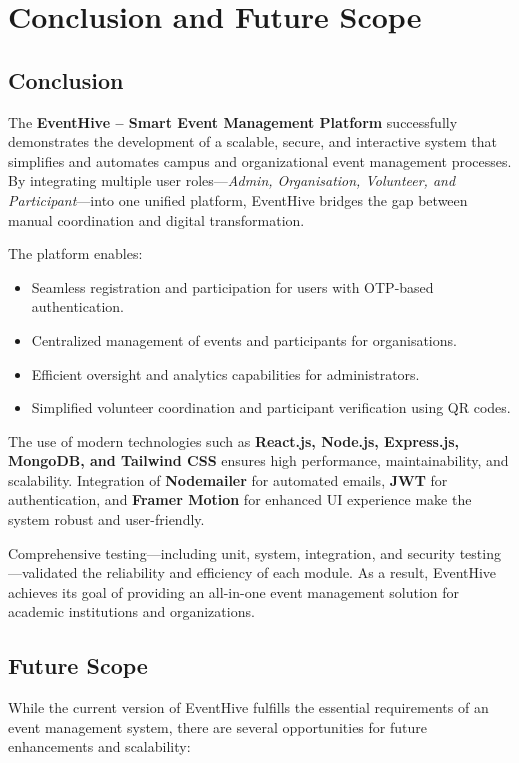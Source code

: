 \documentclass[12pt,a4paper]{report}
\begin{document}
\chapter{Conclusion and Future Scope}

\section{Conclusion}

The \textbf{EventHive – Smart Event Management Platform} successfully demonstrates the development of a scalable, secure, and interactive system that simplifies and automates campus and organizational event management processes. By integrating multiple user roles—\textit{Admin, Organisation, Volunteer, and Participant}—into one unified platform, EventHive bridges the gap between manual coordination and digital transformation.

The platform enables:
\begin{itemize}
    \item Seamless registration and participation for users with OTP-based authentication.
    \item Centralized management of events and participants for organisations.
    \item Efficient oversight and analytics capabilities for administrators.
    \item Simplified volunteer coordination and participant verification using QR codes.
\end{itemize}

The use of modern technologies such as \textbf{React.js, Node.js, Express.js, MongoDB, and Tailwind CSS} ensures high performance, maintainability, and scalability. Integration of \textbf{Nodemailer} for automated emails, \textbf{JWT} for authentication, and \textbf{Framer Motion} for enhanced UI experience make the system robust and user-friendly.

Comprehensive testing—including unit, system, integration, and security testing—validated the reliability and efficiency of each module. As a result, EventHive achieves its goal of providing an all-in-one event management solution for academic institutions and organizations.

\section{Future Scope}

While the current version of EventHive fulfills the essential requirements of an event management system, there are several opportunities for future enhancements and scalability:
\end{document}
